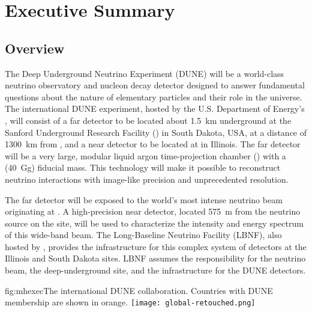 \chapter{Executive Summary }
\label{ch:project-overview}
\section{Overview}

The Deep Underground Neutrino Experiment (DUNE) will be a world-class neutrino observatory and nucleon decay detector designed to answer fundamental questions about the nature of elementary particles and their role in the universe. The international DUNE experiment, hosted by the U.S. Department of Energy's \fnal{}, will consist of a far detector to be located about \SI{1.5}{km} underground at the Sanford Underground Research Facility (\surf) in South Dakota, USA, at a distance of  \SI{1300}{\km} from \fnal{}, and a near detector to be located at \fnal in Illinois. The far detector will be a very large, modular liquid argon time-projection chamber (\lartpc) with a \fdfiducialmass (\SI{40}{\giga\gram}) fiducial mass. This \lar technology will make it possible to reconstruct neutrino interactions with image-like precision and unprecedented resolution. 

The far detector will be exposed to the world's most intense neutrino beam originating at \fnal{}. A high-precision near detector, located \SI{575}{m} from the neutrino source on the \fnal site, will be used to characterize the intensity and energy spectrum of this wide-band beam. The Long-Baseline Neutrino Facility (LBNF), also hosted by \fnal, provides the infrastructure for this complex system of detectors at the Illinois and South Dakota sites. LBNF assumes the responsibility for the neutrino beam, the deep-underground site, and the infrastructure for the DUNE detectors. 


\begin{dunefigure}{fig:mhexec}{The international DUNE
collaboration. Countries with DUNE membership are shown in orange.}
\texttt{[image: global-retouched.png]}  %
\label{fig:map}
\end{dunefigure}

